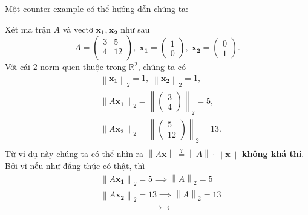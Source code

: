 \documentclass{article}
\newcommand{\norm}[1]{\left\lVert#1\right\rVert}
\newcommand{\twonorm}[1]{\left\lVert#1\right\rVert_{2}}
\begin{document}
Một counter-example có thể hướng dẫn chúng ta:
\begin{Spiel}
	Xét ma trận $A$ và vectơ $\mathbf{x_1}, \mathbf{x_2}$ như sau
  $$
    A = \begin{pmatrix}
    	3 &  5 \\
    	4 & 12 \\
    \end{pmatrix},\;
    \mathbf{x_1} = \begin{pmatrix} 1 \\ 0 \end{pmatrix},\;
    \mathbf{x_2} = \begin{pmatrix} 0 \\ 1 \end{pmatrix}.
  $$
  Với cái $2$-norm quen thuộc trong $\mathbb{R}^2$, chúng ta có
  $$
	  \begin{aligned}
			& \norm{\mathbf{x_1}}_{2} = 1,\; \twonorm{\mathbf{x_2}} = 1, \nonumber \\
			& \norm{A \mathbf{x_1}}_{2} = \norm{\begin{pmatrix} 3 \\ 4 \end{pmatrix}}_{2} = 5, \\
			& \norm{A \mathbf{x_2}}_{2} = \norm{\begin{pmatrix} 5 \\ 12 \end{pmatrix}}_{2} = 13. \\
	  \end{aligned}
  $$
	Từ ví dụ này chúng ta có thể nhìn ra $\norm{A\mathbf{x}} \stackrel{?}{=} \norm{A}\cdot\norm{\mathbf{x}}$ \textbf{không khá thi}. Bởi vì nếu như đẳng thức có thật, thì 
  $$
	  \begin{aligned}
			& \norm{A \mathbf{x_1}}_{2} = 5 \implies \norm{A}_{2} = 5 \\
			& \norm{A \mathbf{x_2}}_{2} = 13 \implies \norm{A}_{2} = 13 \\
			& \qquad\qquad\qquad \rightarrow\!\leftarrow
	  \end{aligned}
  $$
\end{Spiel}
\end{document}
